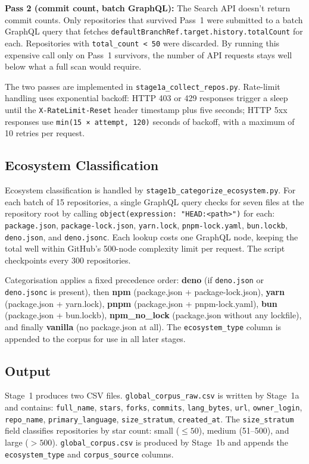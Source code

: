 \textbf{Pass 2 (commit count, batch GraphQL):} The Search API doesn't return commit counts. Only repositories that survived Pass~1 were submitted to a batch GraphQL query that fetches \texttt{defaultBranchRef.target.history.totalCount} for each. Repositories with \texttt{total\_count < 50} were discarded. By running this expensive call only on Pass~1 survivors, the number of API requests stays well below what a full scan would require.

The two passes are implemented in \texttt{stage1a\_collect\_repos.py}. Rate-limit handling uses exponential backoff: HTTP 403 or 429 responses trigger a sleep until the \texttt{X-RateLimit-Reset} header timestamp plus five seconds; HTTP 5xx responses use \texttt{min(15 × attempt, 120)} seconds of backoff, with a maximum of 10 retries per request.

\subsection{Ecosystem Classification}

Ecosystem classification is handled by \texttt{stage1b\_categorize\_ecosystem.py}. For each batch of 15 repositories, a single GraphQL query checks for seven files at the repository root by calling \texttt{object(expression: "HEAD:<path>")} for each: \texttt{package.json}, \texttt{package-lock.json}, \texttt{yarn.lock}, \texttt{pnpm-lock.yaml}, \texttt{bun.lockb}, \texttt{deno.json}, and \texttt{deno.jsonc}. Each lookup costs one GraphQL node, keeping the total well within GitHub's 500-node complexity limit per request. The script checkpoints every 300 repositories.

Categorisation applies a fixed precedence order: \textbf{deno} (if \texttt{deno.json} or \texttt{deno.jsonc} is present), then \textbf{npm} (package.json + package-lock.json), \textbf{yarn} (package.json + yarn.lock), \textbf{pnpm} (package.json + pnpm-lock.yaml), \textbf{bun} (package.json + bun.lockb), \textbf{npm\_no\_lock} (package.json without any lockfile), and finally \textbf{vanilla} (no package.json at all). The \texttt{ecosystem\_type} column is appended to the corpus for use in all later stages.

\subsection{Output}

Stage~1 produces two CSV files. \texttt{global\_corpus\_raw.csv} is written by Stage~1a and contains: \texttt{full\_name}, \texttt{stars}, \texttt{forks}, \texttt{commits}, \texttt{lang\_bytes}, \texttt{url}, \texttt{owner\_login}, \texttt{repo\_name}, \texttt{primary\_language}, \texttt{size\_stratum}, \texttt{created\_at}. The \texttt{size\_stratum} field classifies repositories by star count: small ($\leq 50$), medium (51--500), and large ($> 500$). \texttt{global\_corpus.csv} is produced by Stage~1b and appends the \texttt{ecosystem\_type} and \texttt{corpus\_source} columns.

